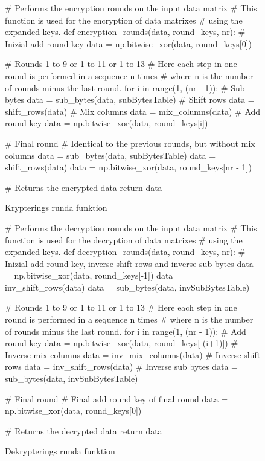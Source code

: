 \begin{figure}[H]
    \centering
    \begin{python}
    # Performs the encryption rounds on the input data matrix
    # This function is used for the encryption of data matrixes
    # using the expanded keys.
    def encryption_rounds(data, round_keys, nr):
        # Inizial add round key
        data = np.bitwise_xor(data, round_keys[0])

        # Rounds 1 to 9 or 1 to 11 or 1 to 13
        # Here each step in one round is performed in a sequence n times
        # where n is the number of rounds minus the last round.
        for i in range(1, (nr - 1)):
            # Sub bytes
            data = sub_bytes(data, subBytesTable)
            # Shift rows
            data = shift_rows(data)
            # Mix columns
            data = mix_columns(data)
            # Add round key
            data = np.bitwise_xor(data, round_keys[i])

        # Final round
        # Identical to the previous rounds, but without mix columns
        data = sub_bytes(data, subBytesTable)
        data = shift_rows(data)
        data = np.bitwise_xor(data, round_keys[nr - 1])

        # Returns the encrypted data
        return data

    \end{python}
    \caption{Krypterings runda funktion}
    \label{fig:encryption-rounds-function}
\end{figure}

\begin{figure}[H]
    \centering
    \begin{python}
    # Performs the decryption rounds on the input data matrix
    # This function is used for the decryption of data matrixes
    # using the expanded keys.
    def decryption_rounds(data, round_keys, nr):
        # Inizial add round key, inverse shift rows and inverse sub bytes
        data = np.bitwise_xor(data, round_keys[-1])
        data = inv_shift_rows(data)
        data = sub_bytes(data, invSubBytesTable)

        # Rounds 1 to 9 or 1 to 11 or 1 to 13
        # Here each step in one round is performed in a sequence n times
        # where n is the number of rounds minus the last round.
        for i in range(1, (nr - 1)):
            # Add round key
            data = np.bitwise_xor(data, round_keys[-(i+1)])
            # Inverse mix columns
            data = inv_mix_columns(data)
            # Inverse shift rows
            data = inv_shift_rows(data)
            # Inverse sub bytes
            data = sub_bytes(data, invSubBytesTable)

        # Final round
        # Final add round key of final round
        data = np.bitwise_xor(data, round_keys[0])

        # Returns the decrypted data
        return data

    \end{python}
    \caption{Dekrypterings runda funktion}
    \label{fig:decryption-rounds-function}
\end{figure}

